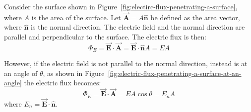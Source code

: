 Consider the surface shown in Figure~\ref{fig:electirc-flux-penetrating-a-surface}, where $A$ is the area of the surface. Let $\vec{\boldsymbol{A}}=A\hat{\boldsymbol{n}}$ be defined as the area vector, where $\hat{\boldsymbol{n}}$ is the normal direction. The electric field and the normal direction are parallel and perpendicular to the surface. The electric flux is then:
\begin{equation}
  \Phi_E = \vec{\boldsymbol{E}} \cdot \vec{\boldsymbol{A}} = \vec{\boldsymbol{E}} \cdot \hat{\boldsymbol{n}}A = EA
\end{equation}

However, if the electric field is not parallel to the normal direction, instead is at an angle of $\theta$, as shown in Figure~\ref{fig:electric-flux-penetrating-a-surface-at-an-angle} the electric flux becomes:
\begin{equation}
  \Phi_E = \vec{\boldsymbol{E}} \cdot \vec{\boldsymbol{A}} = EA\cos{\theta} = E_nA
\end{equation}
where $E_n = \vec{\boldsymbol{E}} \cdot \hat{\boldsymbol{n}}$. 

